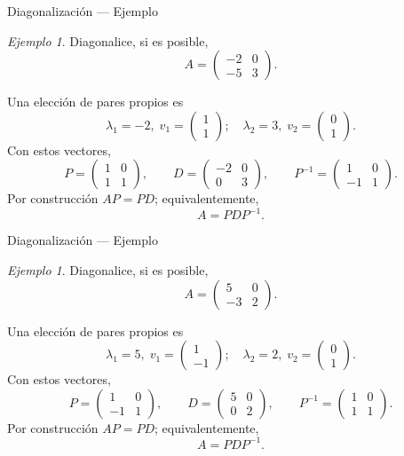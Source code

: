 \documentclass[aspectratio=169,11pt]{beamer}
\theoremstyle{remark}
\newtheorem{Ejem}[definicion]{Ejemplo}
\begin{document}
\begin{frame}[shrink=5]{Diagonalización — Ejemplo}
\footnotesize
\begin{Ejem}


Diagonalice, si es posible,
\[
A=\begin{pmatrix}-2 & 0\\-5 & 3\end{pmatrix}.
\]

\scriptsize
Una elección de pares propios es
\[
\lambda_1=-2,\;v_1=\begin{pmatrix}1\\1\end{pmatrix};\quad \lambda_2=3,\;v_2=\begin{pmatrix}0\\1\end{pmatrix}.
\]
Con estos vectores,
\[
P=\begin{pmatrix}1 & 0\\1 & 1\end{pmatrix},\qquad D=\begin{pmatrix}-2 & 0\\0 & 3\end{pmatrix},\qquad P^{-1}=\begin{pmatrix}1 & 0\\-1 & 1\end{pmatrix}.
\]
Por construcción $AP=PD$; equivalentemente,
\[
\boxed{A=PDP^{-1}}.
\]

\end{Ejem}
\end{frame}

\begin{frame}[shrink=5]{Diagonalización — Ejemplo}
\footnotesize
\begin{Ejem}

Diagonalice, si es posible,
\[
A=\begin{pmatrix}5 & 0\\-3 & 2\end{pmatrix}.
\]


\scriptsize
Una elección de pares propios es
\[
\lambda_1=5,\;v_1=\begin{pmatrix}1\\-1\end{pmatrix};\quad \lambda_2=2,\;v_2=\begin{pmatrix}0\\1\end{pmatrix}.
\]
Con estos vectores,
\[
P=\begin{pmatrix}1 & 0\\-1 & 1\end{pmatrix},\qquad D=\begin{pmatrix}5 & 0\\0 & 2\end{pmatrix},\qquad P^{-1}=\begin{pmatrix}1 & 0\\1 & 1\end{pmatrix}.
\]
Por construcción $AP=PD$; equivalentemente,
\[
\boxed{A=PDP^{-1}}.
\]

\end{Ejem}
\end{frame}
\end{document}
